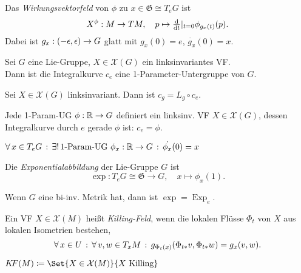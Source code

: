 \documentclass{cheat-sheet}
\DeclareMathOperator{\Exp}{Exp} %
\newcommand{\vinterval}{\ointerval{-\epsilon}{\epsilon}} %
\newcommand{\Gie}{\mathfrak{G}} %
\newcommand{\KF}{K\!F} %
\newcommand{\VF}{\mathcal{X}} %
\begin{document}
\begin{defn}
  Das \emph{Wirkungsvektorfeld} von $\phi$ zu $x \in \Gie \cong T_e G$ ist
  \[
    X^\phi : M \to TM, \quad
    p \mapsto \tfrac{\mathrm{d}}{\mathrm{d} t}|_{t=0} \phi_{g_x(t)}(p).
  \]
  Dabei ist $g_x : \vinterval \to G$ glatt mit $g_x(0) = e$, $\dot{g_x}(0) = x$.
\end{defn}


\begin{lem}
  Sei $G$ eine Lie-Gruppe, $X \in \VF(G)$ ein linksinvariantes VF. \\
  Dann ist die Integralkurve $c_e$ eine 1-Parameter-Untergruppe von $G$.
\end{lem}

\begin{lem}
  Sei $X \in \VF(G)$ linksinvariant. Dann ist $c_g = L_g \circ c_e$.
\end{lem}

\begin{lem}
  Jede 1-Param-UG $\phi : \mathbb{R} \to G$ definiert ein linksinv. VF $X \in \VF(G)$, dessen Integralkurve durch $e$ gerade $\phi$ ist: $c_e = \phi$.
\end{lem}

\begin{fazit}
  $\forall \, {x \in T_e G} \,:\, \exists! \, {\text{1-Param-UG } \phi_x : \mathbb{R} \to G} \,:\, \dot{\phi_x}(0) = x$
\end{fazit}

\begin{defn}
  Die \emph{Exponentialabbildung} der Lie-Gruppe $G$ ist
  \[
    \exp : T_e G \cong \Gie \to G, \quad
    x \mapsto \phi_x(1).
  \]
\end{defn}

\begin{bem}
  Wenn $G$ eine bi-inv. Metrik hat, dann ist $\exp = \Exp_e$.
\end{bem}


\begin{defn}
  Ein VF $X \in \VF(M)$ heißt \emph{Killing-Feld}, wenn die lokalen Flüsse $\Phi_t$ von $X$ aus lokalen Isometrien bestehen, \dh{}
  \[
    \forall \, {x \in U} \,:\, \forall \, {v, w \in T_x M} \,:\,
    g_{\Phi_t(x)}(\Phi_{t*} v, \Phi_{t*} w) = g_x(v, w).
  \]
\end{defn}

\begin{nota}
  $\KF(M) \coloneqq \Set{X \in \VF(M)}{X \text{ Killing}}$
\end{nota}
\end{document}
